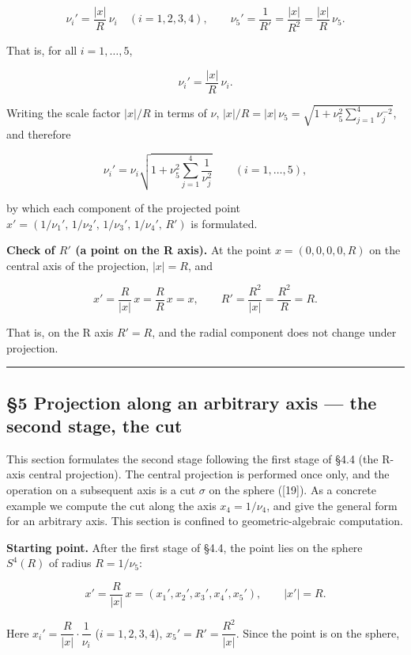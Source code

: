\documentclass[
]{article}
\begin{document}
\[\nu_i' = \frac{|x|}{R}\,\nu_i\quad(i=1,2,3,4),\qquad \nu_5' = \frac{1}{R'} = \frac{|x|}{R^2} = \frac{|x|}{R}\,\nu_5.\]

That is, for all \(i=1,\dots,5\),

\[\nu_i' = \frac{|x|}{R}\,\nu_i.\]

Writing the scale factor \(|x|/R\) in terms of \(\nu\),
\(|x|/R = |x|\,\nu_5 = \sqrt{1+\nu_5^2\sum_{j=1}^{4}\nu_j^{-2}}\), and
therefore

\[\nu_i' = \nu_i\sqrt{1+\nu_5^2\sum_{j=1}^{4}\frac{1}{\nu_j^2}}\qquad(i=1,\dots,5),\]

by which each component of the projected point
\(x'=(1/\nu_1',\,1/\nu_2',\,1/\nu_3',\,1/\nu_4',\,R')\) is formulated.

\textbf{Check of \(R'\) (a point on the R axis).} At the point
\(x=(0,0,0,0,R)\) on the central axis of the projection, \(|x|=R\), and

\[x' = \frac{R}{|x|}\,x = \frac{R}{R}\,x = x,\qquad R' = \frac{R^2}{|x|} = \frac{R^2}{R} = R.\]

That is, on the R axis \(R'=R\), and the radial component does not
change under projection.

\begin{center}\rule{0.5\linewidth}{0.5pt}\end{center}

\subsection{§5 Projection along an arbitrary axis --- the second stage,
the
cut}\label{projection-along-an-arbitrary-axis-the-second-stage-the-cut}

This section formulates the second stage following the first stage of
§4.4 (the R-axis central projection). The central projection is
performed once only, and the operation on a subsequent axis is a cut
\(\sigma\) on the sphere ({[}19{]}). As a concrete example we compute
the cut along the axis \(x_4=1/\nu_4\), and give the general form for an
arbitrary axis. This section is confined to geometric-algebraic
computation.

\textbf{Starting point.} After the first stage of §4.4, the point lies
on the sphere \(S^4(R)\) of radius \(R=1/\nu_5\):

\[x'=\frac{R}{|x|}\,x=(x_1',x_2',x_3',x_4',x_5'),\qquad |x'|=R.\]

Here \(x_i'=\dfrac{R}{|x|}\cdot\dfrac{1}{\nu_i}\) (\(i=1,2,3,4\)),
\(x_5'=R'=\dfrac{R^2}{|x|}\). Since the point is on the sphere,
\end{document}
